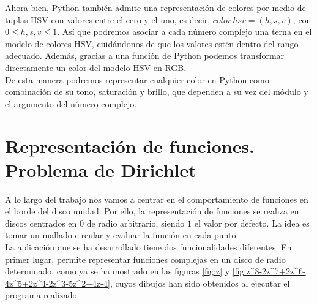 Ahora bien, Python también admite una representación de colores por medio de tuplas HSV con valores entre el cero y el uno, es decir, $color \, hsv = (h, s, v)$, con $0 \leq h, s, v \leq 1$. Así que podremos asociar a cada número complejo una terna en el modelo de colores HSV, cuidándonos de que los valores estén dentro del rango adecuado. Además, gracias a una función de Python podemos transformar directamente un color del modelo HSV en RGB. \\

De esta manera podremos representar cualquier color en Python como combinación de su tono, saturación y brillo, que dependen a su vez del módulo y el argumento del número complejo. \\


\section{Representación de funciones. Problema de Dirichlet}

A lo largo del trabajo nos vamos a centrar en el comportamiento de funciones en el borde del disco unidad. Por ello, la representación de funciones se realiza en discos centrados en $0$ de radio arbitrario, siendo $1$ el valor por defecto. La idea es tomar un mallado circular y evaluar la función en cada punto. \\

La aplicación que se ha desarrollado tiene dos funcionalidades diferentes. En primer lugar, permite representar funciones complejas en un disco de radio determinado, como ya se ha mostrado en las figuras \ref{fig:z} y \ref{fig:z^8-2z^7+2z^6-4z^5+2z^4-2z^3-5z^2+4z-4}, cuyos dibujos han sido obtenidos al ejecutar el programa realizado. \\


